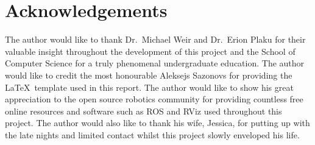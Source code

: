 


\chapter{Acknowledgements}

\label{chapter:ack}

The author would like to thank Dr.\ Michael Weir and Dr.\ Erion Plaku for their
valuable insight throughout the development of this project and the School of
Computer Science for a truly phenomenal undergraduate education. The author
would like to credit the most honourable Aleksejs Sazonovs for providing the
\LaTeX \, template used in this report. The author would like to show his great
appreciation to the open source robotics community for providing countless free
online resources and software such as ROS and RViz used throughout this
project. The author would also like to thank his wife, Jessica, for putting up
with the late nights and limited contact whilst this project slowly enveloped
his life.



